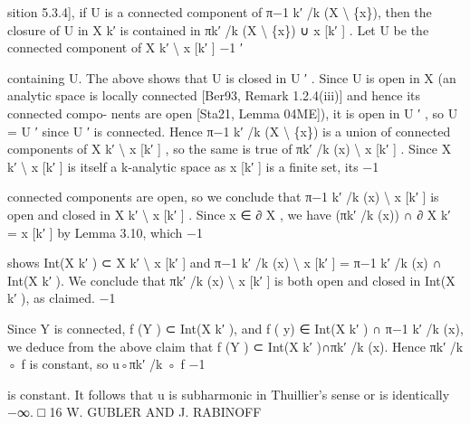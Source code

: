 \documentclass[
  10pt,
]{article}
\newenvironment{Shaded}{}{}
\newcommand{\NormalTok}[1]{#1}
\begin{document}
\begin{Shaded}
\begin{Highlighting}[]
\NormalTok{sition 5.3.4], if U is a connected component of π−1               k′ /k}
\NormalTok{                                                                        (X \textbackslash{} \{x\}), then the closure of U in}
\NormalTok{X k′ is contained in πk′ /k (X \textbackslash{} \{x\}) ∪ x [k′ ] . Let U be the connected component of X k′ \textbackslash{} x [k′ ]}
\NormalTok{                            −1                                ′}

\NormalTok{containing U. The above shows that U is closed in U ′ . Since U is open in X (an analytic}
\NormalTok{space is locally connected [Ber93, Remark 1.2.4(iii)] and hence its connected compo{-}}
\NormalTok{nents are open [Sta21, Lemma 04ME]), it is open in U ′ , so U = U ′ since U ′ is connected.}
\NormalTok{Hence π−1  k′ /k}
\NormalTok{                 (X \textbackslash{} \{x\}) is a union of connected components of X k′ \textbackslash{} x [k′ ] , so the same is}
\NormalTok{true of πk′ /k (x) \textbackslash{} x [k′ ] . Since X k′ \textbackslash{} x [k′ ] is itself a k{-}analytic space as x [k′ ] is a finite set, its}
\NormalTok{           −1}

\NormalTok{connected components are open, so we conclude that π−1                       k′ /k}
\NormalTok{                                                                                   (x) \textbackslash{} x [k′ ] is open and closed}
\NormalTok{in X k′ \textbackslash{} x [k′ ] . Since x ∈ ∂ X , we have (πk′ /k (x)) ∩ ∂ X k′ = x [k′ ] by Lemma 3.10, which}
\NormalTok{                                                         −1}

\NormalTok{shows Int(X k′ ) ⊂ X k′ \textbackslash{} x [k′ ] and π−1   k′ /k}
\NormalTok{                                                  (x) \textbackslash{} x [k′ ] = π−1 k′ /k}
\NormalTok{                                                                            (x) ∩ Int(X k′ ). We conclude that}
\NormalTok{πk′ /k (x) \textbackslash{} x [k′ ] is both open and closed in Int(X k′ ), as claimed.}
\NormalTok{  −1}

\NormalTok{    Since Y is connected, f (Y ) ⊂ Int(X k′ ), and f ( y) ∈ Int(X k′ ) ∩ π−1            k′ /k}
\NormalTok{                                                                                              (x), we deduce from}
\NormalTok{the above claim that f (Y ) ⊂ Int(X k′ )∩πk′ /k (x). Hence πk′ /k ◦ f is constant, so u◦πk′ /k ◦ f}
\NormalTok{                                                      −1}

\NormalTok{is constant. It follows that u is subharmonic in Thuillier’s sense or is identically −∞. □}
\NormalTok{16                                        W. GUBLER AND J. RABINOFF}


\end{Highlighting}
\end{Shaded}
\end{document}
